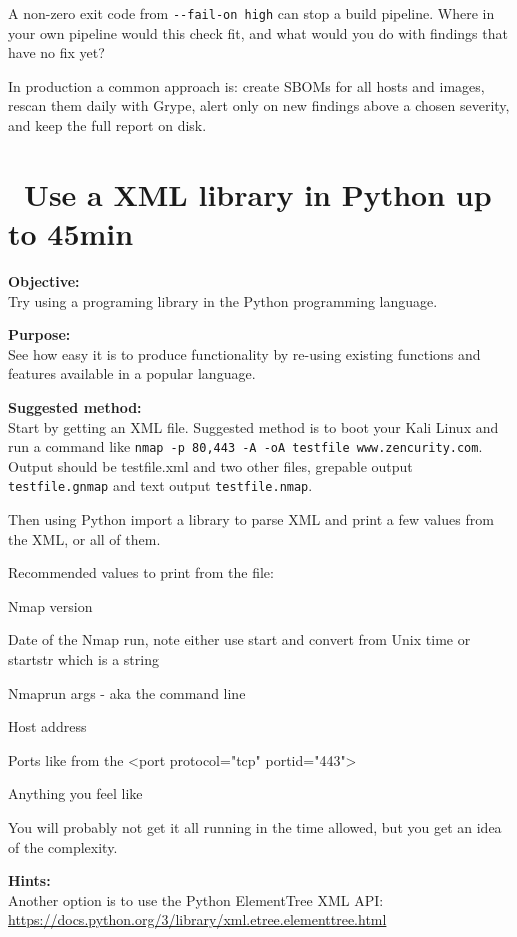 \documentclass[a4paper,11pt,notitlepage]{report}
\begin{document}
A non-zero exit code from \verb+--fail-on high+ can stop a build pipeline. Where in your own pipeline would this check fit, and what would you do with findings that have no fix yet?

In production a common approach is: create SBOMs for all hosts and images, rescan them daily with Grype, alert only on new findings above a chosen severity, and keep the full report on disk.


\chapter{\faInfoCircle\ Use a XML library in Python up to 45min}
\label{ex-python-library}

{\bf Objective:}\\
Try using a programing library in the Python programming language.

{\bf Purpose:}\\
See how easy it is to produce functionality by re-using existing functions and features available in a popular language.

{\bf Suggested method:}\\
Start by getting an XML file. Suggested method is to boot your Kali Linux and run a command like \verb+nmap -p 80,443 -A -oA testfile www.zencurity.com+. Output should be testfile.xml and two other files, grepable output \verb+testfile.gnmap+ and text output \verb+testfile.nmap+.

Then using Python import a library to parse XML and print a few values from the XML, or all of them.

Recommended values to print from the file:
\begin{list2}
\item Nmap version
\item Date of the Nmap run, note either use start and convert from Unix time or startstr which is a string
\item Nmaprun args - aka the command line
\item Host address
\item Ports like from the <port protocol="tcp" portid="443">
\item Anything you feel like
\end{list2}

You will probably not get it all running in the time allowed, but you get an idea of the complexity.

{\bf Hints:}\\
Another option is to use the Python ElementTree XML API:\\
\url{https://docs.python.org/3/library/xml.etree.elementtree.html}
\end{document}
